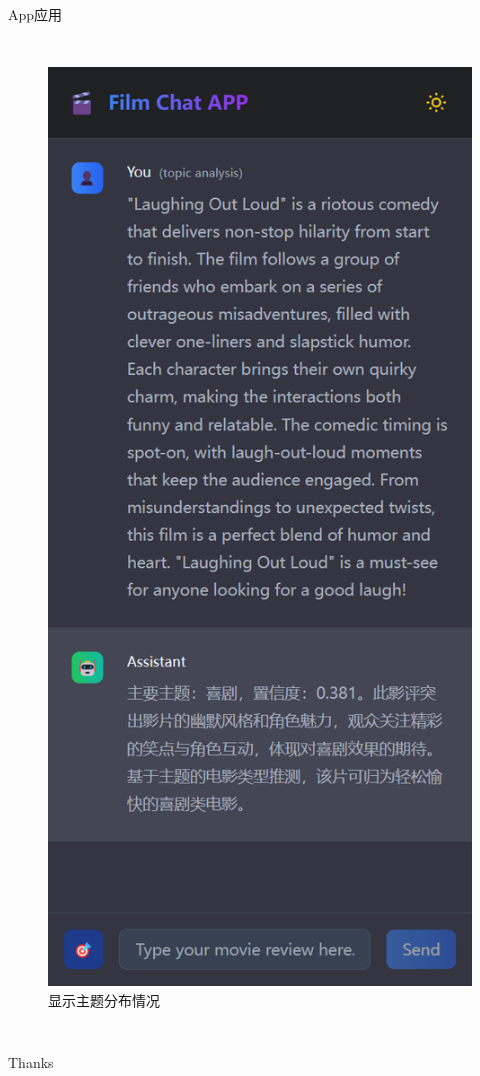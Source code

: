 \documentclass{beamer}
\begin{document}
\begin{frame}{App应用}
\begin{columns}[T]
        \begin{figure}
            \includegraphics[width=\textwidth,height=0.7\textheight,keepaspectratio]{pic/display2.png}
            \centering
            \\
            \small{显示主题分布情况}
        \end{figure}
    \end{columns}
\end{frame}

\begin{frame}
    \begin{center}
        {\Huge\calligra Thanks}
    \end{center}
\end{frame}
\end{document}
